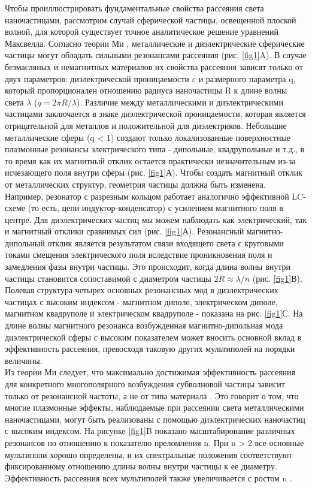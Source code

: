 \hspace*{2mm}Чтобы проиллюстрировать фундаментальные свойства рассеяния света наночастицами, рассмотрим случай сферической частицы, освещенной плоской волной, для которой существует точное аналитическое решение уравнений Максвелла. Согласно теории Ми \cite{absorbScattLight}, металлические и диэлектрические сферические частицы могут обладать сильными резонансами рассеяния (рис. \ref{fig1}A). В случае безмасляных и немагнитных материалов их свойства рассеяния зависят только от двух параметров: диэлектрической проницаемости $\varepsilon$  и размерного параметра q, который пропорционален отношению радиуса наночастицы R к длине волны света $\lambda$ ($q = 2\pi R/\lambda$). Различие между металлическими и диэлектрическими частицами заключается в знаке диэлектрической проницаемости, которая является отрицательной для металлов и положительной для диэлектриков. Небольшие металлические сферы (q < 1) создают только локализованные поверхностные плазмонные резонансы электрического типа - дипольные, квадрупольные и т.д., в то время как их магнитный отклик остается практически незначительным из-за исчезающего поля внутри сферы (рис. \ref{fig1}А).  Чтобы создать магнитный отклик от металлических структур, геометрия частицы должна быть изменена. Например, резонатор с разрезным кольцом \cite{pendry1999magnetism} работает аналогично эффективной LC-схеме (то есть, цепи индуктор-конденсатор) с усилением магнитного поля в центре. Для диэлектрических частиц мы можем наблюдать как электрический, так и магнитный отклики сравнимых сил (рис. \ref{fig1}А). Резонансный магнитно-дипольный отклик является результатом связи входящего света с круговыми токами смещения электрического поля вследствие проникновения поля и замедления фазы внутри частицы. Это происходит, когда длина волны внутри частицы становится сопоставимой с диаметром частицы $2R \approx \lambda/n$ (рис. \ref{fig1}В). Полевая структура четырех основных резонансных мод в диэлектрических частицах с высоким индексом - магнитном диполе, электрическом диполе, магнитном квадруполе и электрическом квадруполе - показана на рис. \ref{fig1}С. На длине волны магнитного резонанса возбужденная магнитно-дипольная мода диэлектрической сферы с высоким показателем может вносить основной вклад в эффективность рассеяния, превосходя таковую других мультиполей на порядки величины.
\\
\hspace*{2mm}
Из теории Ми следует, что максимально достижимая эффективность рассеяния для конкретного многополярного возбуждения субволновой частицы зависит только от резонансной частоты, а не от типа материала \cite{schuller2009general}. Это говорит о том, что многие плазмонные эффекты, наблюдаемые при рассеянии света металлическими наночастицами, могут быть реализованы с помощью диэлектрических наночастиц с высоким индексом. На рисунке \ref{fig1}B показано масштабирование различных резонансов по отношению к показателю преломления n. При n > 2 все основные мультиполи хорошо определены, и их спектральные положения соответствуют фиксированному отношению длины волны внутри частицы к ее диаметру. Эффективность рассеяния всех мультиполей также увеличивается с ростом n \cite{articleOptSi}.
